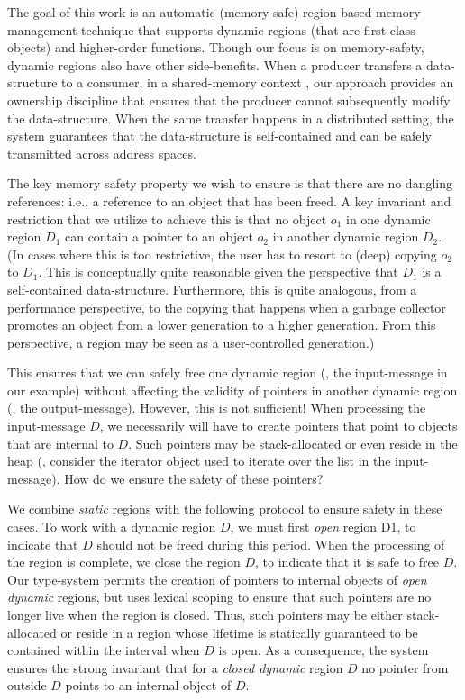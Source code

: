 The goal of this work is an automatic (memory-safe) region-based memory management technique
that supports dynamic regions (that are first-class objects) and higher-order functions.
Though our focus is on memory-safety, dynamic regions also have other side-benefits.
When a producer transfers a data-structure to a consumer, in a shared-memory context , our approach
provides an ownership discipline that ensures that the producer cannot subsequently modify
the data-structure. When the same transfer happens in a distributed setting, the system guarantees
that the data-structure is self-contained and can be safely transmitted across address spaces.

The key memory safety property we wish to ensure is that there are no dangling references:
i.e., a reference to an object that has been freed.
A key invariant and restriction that we utilize to achieve this is that no object $o_1$ in one dynamic
region $D_1$ can contain a pointer to an object $o_2$ in another dynamic region $D_2$.
(In cases where this is too restrictive, the user has to resort to (deep) copying $o_2$ to $D_1$.
This is conceptually quite reasonable given the perspective that $D_1$ is a self-contained data-structure.
Furthermore, this is quite analogous, from a performance perspective, to the copying that happens
when a garbage collector promotes an object from a lower generation to a higher generation.
From this perspective, a region may be seen as a user-controlled generation.)

This ensures that we can safely free one dynamic region (\eg, the input-message in our example)
without affecting the validity of pointers in another dynamic region (\eg, the output-message).
However, this is not sufficient! When processing the input-message $D$, we necessarily will have to create
pointers that point to objects that are internal to $D$. Such pointers may be stack-allocated or even reside
in the heap (\eg, consider the iterator object used to iterate over the list in the input-message).
How do we ensure the safety of these pointers?

We combine \emph{static} regions with the following protocol to ensure safety in these cases.
To work with a dynamic region $D$, we must first \emph{open} region D1,
to indicate that $D$ should not be freed during this period.
When the processing of the region is complete, we close the region $D$,
to indicate that it is safe to free $D$.
Our type-system permits the creation of pointers to internal objects of \emph{open dynamic} regions,
but uses lexical scoping to ensure that such pointers are no longer live when the region is closed.
Thus, such pointers may be either stack-allocated or reside in a region whose lifetime is statically
guaranteed to be contained within the interval when $D$ is open.
As a consequence, the system ensures the strong invariant that for a \emph{closed dynamic} region $D$
no pointer from outside $D$ points to an internal object of $D$.

